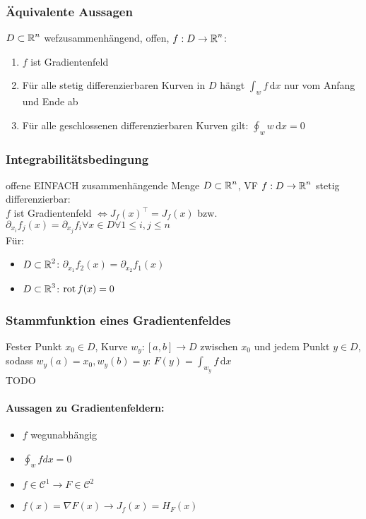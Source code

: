 \documentclass[german]{latex4ei/latex4ei_sheet}
\begin{document}
\subsubsection{\"Aquivalente Aussagen}
$D \subset \operatorname{\mathbb R}^n$ wefzusammenh\"angend, offen, $f:D\to\operatorname{\mathbb R}^n$:\\
\begin{enumerate}
\item $f$ ist Gradientenfeld
\item F\"ur alle stetig differenzierbaren Kurven in $D$ h\"angt $\int_w \! f \, \mathrm{d} x$ nur vom Anfang und Ende ab
\item F\"ur alle geschlossenen differenzierbaren Kurven gilt: $\oint_w \! w \, \mathrm{d}x=0$
\end{enumerate}

\subsubsection{Integrabilit\"atsbedingung}
offene EINFACH zusammenh\"angende Menge $D \subset \operatorname{\mathbb R}^n$, VF $f:D\to \operatorname{\mathbb R}^n$ stetig differenzierbar:\\
$f$ ist Gradientenfeld $\Leftrightarrow J_f(x)^\top=J_f(x)$ bzw. $\partial_{x_i}f_j(x)=\partial_{x_j}f_i \forall x \in D \forall1\le i,j \le n$\\
F\"ur:
\begin{itemize}
\item $D \subset \operatorname{\mathbb R}^2$: $\partial_{x_1}f_2(x)=\partial_{x_2}f_1(x)$
\item $D \subset \operatorname{\mathbb R}^3$: $\operatorname{rot} f(x)=0$
\end{itemize}

\subsubsection{Stammfunktion eines Gradientenfeldes}
Fester Punkt $x_0 \in D$, Kurve $w_y: [a,b]\to D$ zwischen $x_0$ und jedem Punkt $y\in D$, sodass $w_y(a)=x_0, w_y(b)=y$:
$F(y)=\int_{w_y}\! f \, \mathrm{d} x$\\
TODO
\paragraph{Aussagen zu Gradientenfeldern:}
\begin{itemize}
\item $f$ wegunabh\"angig
\item $\oint_w f d x=0$
\item $f \in \mathcal{C}^1 \rightarrow F \in \mathcal{C}^2$
\item $f(x)=\nabla F(x) \rightarrow J_f(x)=H_F(x)$
\end{itemize}
\end{document}
